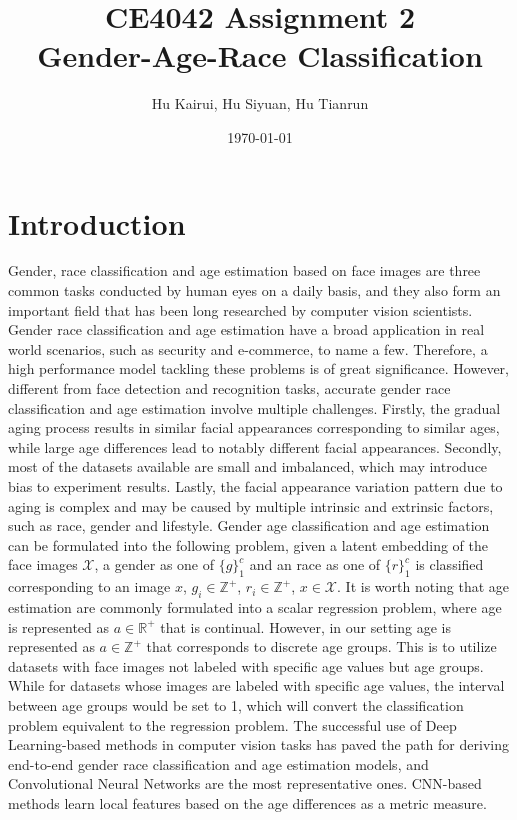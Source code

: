 \documentclass[DIV=calc, paper=a4, fontsize=10pt, twocolumn]{article}
\title{CE4042 Assignment 2\\
	\large Gender-Age-Race Classification}
\author{Hu Kairui, Hu Siyuan, Hu Tianrun}
\date{\today}
\begin{document}
	\maketitle
	\section{Introduction}
	
	Gender, race classification and age estimation based on face images are three common tasks conducted by human eyes on a daily basis, and they also form an important field that has been long researched by computer vision scientists. Gender race classification and age estimation have a broad application in real world scenarios, such as security and e-commerce, to name a few. Therefore, a high performance model tackling these problems is of great significance. However, different from face detection and recognition tasks, accurate gender race classification and age estimation involve multiple challenges. Firstly, the gradual aging process results in similar facial appearances corresponding to similar ages, while large age differences lead to notably different facial appearances. Secondly, most of the datasets available are small and imbalanced, which may introduce bias to experiment results. Lastly, the facial appearance variation pattern due to aging is complex and may be caused by multiple intrinsic and extrinsic factors, such as race, gender and lifestyle. Gender age classification and age estimation can be formulated into the following problem, given a latent embedding of the face images $\mathcal{X}$, a gender as one of $\{g\}_1^c$ and an race as one of $\{r\}_1^c$ is classified corresponding to an image $x$, $g_i\in\mathbb{Z}^+$, $r_i\in\mathbb{Z}^+$, $x\in\mathcal{X}$. It is worth noting that age estimation are commonly formulated into a scalar regression problem, where age is represented as $a\in\mathbb{R}^+$ that is continual. However, in our setting age is represented as $a\in\mathbb{Z}^+$ that corresponds to discrete age groups. This is to utilize datasets with face images not labeled with specific age values but age groups. While for datasets whose images are labeled with specific age values, the interval between age groups would be set to 1, which will convert the classification problem equivalent to the regression problem. The successful use of Deep Learning-based methods in computer vision tasks has paved the path for deriving end-to-end gender race classification and age estimation models, and Convolutional Neural Networks are the most representative ones. CNN-based methods learn local features based on the age differences as a metric measure. 
\end{document}
